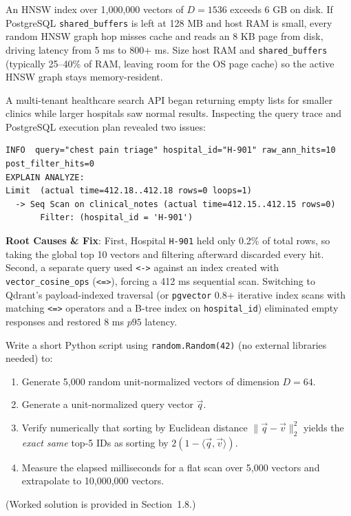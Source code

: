 \begin{productionwarningbox}
An HNSW index over 1,000,000 vectors of $D = 1536$ exceeds 6 GB on disk. If PostgreSQL \texttt{shared\_buffers} is left at 128 MB and host RAM is small, every random HNSW graph hop misses cache and reads an 8 KB page from disk, driving latency from 5 ms to 800+ ms. Size host RAM and \texttt{shared\_buffers} (typically 25--40\% of RAM, leaving room for the OS page cache) so the active HNSW graph stays memory-resident.
\end{productionwarningbox}

\begin{realworldbox}
A multi-tenant healthcare search API began returning empty lists for smaller clinics while larger hospitals saw normal results. Inspecting the query trace and PostgreSQL execution plan revealed two issues:
\begin{lstlisting}[basicstyle=\ttfamily\scriptsize]
INFO  query="chest pain triage" hospital_id="H-901" raw_ann_hits=10 post_filter_hits=0
EXPLAIN ANALYZE:
Limit  (actual time=412.18..412.18 rows=0 loops=1)
  -> Seq Scan on clinical_notes (actual time=412.15..412.15 rows=0)
       Filter: (hospital_id = 'H-901')
\end{lstlisting}
\textbf{Root Causes \& Fix}: First, Hospital \texttt{H-901} held only 0.2\% of total rows, so taking the global top 10 vectors and filtering afterward discarded every hit. Second, a separate query used \texttt{<->} against an index created with \texttt{vector\_cosine\_ops} (\texttt{<=>}), forcing a 412 ms sequential scan. Switching to Qdrant's payload-indexed traversal (or \texttt{pgvector} 0.8+ iterative index scans with matching \texttt{<=>} operators and a B-tree index on \texttt{hospital\_id}) eliminated empty responses and restored 8 ms $p95$ latency.
\end{realworldbox}

\begin{tryityourselfbox}
Write a short Python script using \texttt{random.Random(42)} (no external libraries needed) to:
\begin{enumerate}
  \item Generate 5,000 random unit-normalized vectors of dimension $D = 64$.
  \item Generate a unit-normalized query vector $\vec{q}$.
  \item Verify numerically that sorting by Euclidean distance $\|\vec{q} - \vec{v}\|_2^2$ yields the \emph{exact same} top-5 IDs as sorting by $2(1 - \langle \vec{q}, \vec{v} \rangle)$.
  \item Measure the elapsed milliseconds for a flat scan over 5,000 vectors and extrapolate to 10,000,000 vectors.
\end{enumerate}
(Worked solution is provided in Section~1.8.)
\end{tryityourselfbox}

